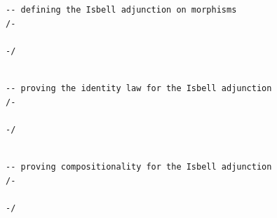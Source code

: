 \documentclass{book}
\theoremstyle{definition}
\newcounter{lcounter}
\begin{document}
{{\begin{center}
\begin{tcolorbox}[width=5in,colback={white},title={\begin{center}\texttt{Lean \thelcounter} \addtocounter{lcounter}{1}  \end{center}},colbacktitle=Blue,coltitle=black]
\begin{verbatim}
-- defining the Isbell adjunction on morphisms
/-

-/

\end{verbatim}
\end{tcolorbox}
\end{center}


\begin{center}
\begin{tcolorbox}[width=5in,colback={white},title={\begin{center}\texttt{Lean \thelcounter} \addtocounter{lcounter}{1}  \end{center}},colbacktitle=Blue,coltitle=black]
\begin{verbatim}

-- proving the identity law for the Isbell adjunction
/-

-/

\end{verbatim}
\end{tcolorbox}
\end{center}


\begin{center}
\begin{tcolorbox}[width=5in,colback={white},title={\begin{center}\texttt{Lean \thelcounter} \addtocounter{lcounter}{1}  \end{center}},colbacktitle=Blue,coltitle=black]
\begin{verbatim}

-- proving compositionality for the Isbell adjunction
/-

-/

\end{verbatim}
\end{tcolorbox}
\end{center}


\begin{center}
\begin{tcolorbox}[width=5in,colback={white},title={\begin{center}\texttt{Lean \thelcounter} \addtocounter{lcounter}{1}  \end{center}},colbacktitle=Blue,coltitle=black]
\begin{verbatim}


\end{verbatim}
\end{tcolorbox}
\end{center}}}
\end{document}
